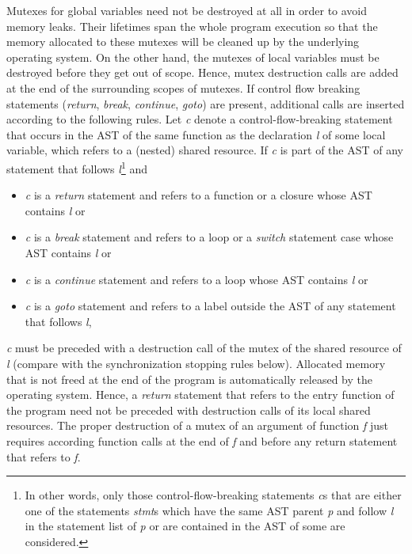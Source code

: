 Mutexes for global variables need not be destroyed at all in order to avoid memory leaks. Their lifetimes span the whole program execution so that the  memory allocated to these mutexes will be cleaned up by the underlying operating system. On the other hand, the mutexes of local variables must be destroyed before they get out of scope. Hence, mutex destruction calls are added at the end of the surrounding scopes of mutexes. If control flow breaking statements (\textit{return}, \textit{break}, \textit{continue}, \textit{goto}) are present, additional calls are inserted according to the following rules. Let \textit{c} denote a control-flow-breaking statement that occurs in the AST of the same function as the declaration \textit{l} of some local variable, which refers to a (nested) shared resource. If \textit{c} is part of the AST of any statement that follows \textit{l}\footnote{In other words, only those control-flow-breaking statements \textit{c}s that are either one of the statements \textit{stmt}s which have the same AST parent \textit{p} and follow \textit{l} in the statement list of \textit{p} or are contained in the AST of some  are considered.} and
\begin{itemize}
\item \textit{c} is a \textit{return} statement and refers to a function or a closure whose AST contains \textit{l} or
\item \textit{c} is a \textit{break} statement and refers to a loop or a \textit{switch} statement case whose AST contains \textit{l} or
\item \textit{c} is a \textit{continue} statement and refers to a loop whose AST contains \textit{l} or
\item \textit{c} is a \textit{goto} statement and refers to a label outside the AST of any statement that follows \textit{l},
\end{itemize}
\textit{c} must be preceded with a destruction call of the mutex of the shared resource of \textit{l} (compare with the synchronization stopping rules below). Allocated memory that is not freed at the end of the program is automatically released by the operating system. Hence, a \textit{return} statement that refers to the entry function of the program need not be preceded with destruction calls of its local shared resources. The proper destruction of a mutex of an argument of function \textit{f} just requires according function calls at the end of \textit{f} and before any return statement that refers to \textit{f}. 


